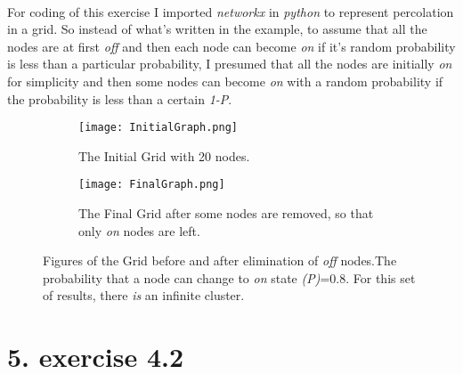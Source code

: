 \documentclass[12pt]{article}
\begin{document}
\paragraph*{} For coding of this exercise I imported \textit{networkx} in \textit{python} to represent percolation in a grid. So instead of what's written in the example, to assume that all the nodes are at first \textit{off} and then each node can become \textit{on} if it's random probability is less than a particular probability, I presumed that all the nodes are initially \textit{on} for simplicity and then some nodes can become \textit{on} with a random probability if the probability is less than a certain \textit{1-P}. 
\begin{figure}[H]
	\centering
	\begin{subfigure}[t]{0.45\textwidth}
		\texttt{[image: InitialGraph.png]}
		\label{fig:mesh4.1}
		\caption{The Initial Grid with 20 nodes.}
	\end{subfigure}\hfill
	\begin{subfigure}[t]{0.45\textwidth}
		\texttt{[image: FinalGraph.png]}
		\label{fig:mesh4.2}
		\caption{The Final Grid after some nodes are removed, so that only \textit{on} nodes are left.}
	\end{subfigure}
	\label{fig:mesh4}
	\caption{Figures of the Grid before and after elimination of \textit{off} nodes.The probability that a node can change to \textit{on}  state \textit{(P)}=0.8. For this set of results, there \textit{is} an infinite cluster.}
\end{figure}
\pagebreak
\part*{5. exercise 4.2}
\end{document}
